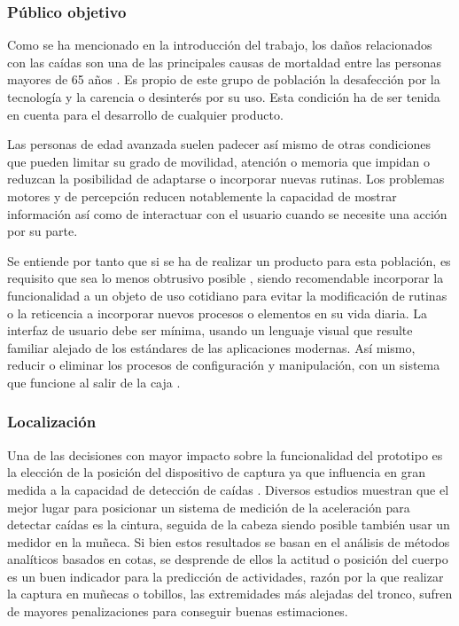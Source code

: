 \subsubsection{Público objetivo}
Como se ha mencionado en la introducción del trabajo, los daños relacionados con las caídas son una de las principales causas de mortaldad entre las personas mayores de 65 años . Es propio de este grupo de población la desafección por la tecnología y la carencia o desinterés por su uso. Esta condición ha de ser tenida en cuenta para el desarrollo de cualquier producto.

Las personas de edad avanzada suelen padecer así mismo de otras condiciones que pueden limitar su grado de movilidad, atención o memoria que impidan o reduzcan la posibilidad de adaptarse o incorporar nuevas rutinas. Los problemas motores y de percepción reducen notablemente la capacidad de mostrar información así como de interactuar con el usuario cuando se necesite una acción por su parte.

Se entiende por tanto que si se ha de realizar un producto para esta población, es requisito que sea lo menos obtrusivo posible , siendo recomendable incorporar la funcionalidad a un objeto de uso cotidiano para evitar la modificación de rutinas o la reticencia a incorporar nuevos procesos o elementos en su vida diaria. La interfaz de usuario debe ser mínima, usando un lenguaje visual que resulte familiar alejado de los estándares de las aplicaciones modernas. Así mismo, reducir o eliminar los procesos de configuración y manipulación, con un sistema que funcione al salir de la caja .

\subsubsection{Localización}

Una de las decisiones con mayor impacto sobre la funcionalidad del prototipo es la elección de la posición del dispositivo de captura ya que influencia en gran medida a la capacidad de detección de caídas \cite{Kangas2008}. Diversos estudios muestran que el mejor lugar para posicionar un sistema de medición de la aceleración para detectar caídas es la cintura, seguida de la cabeza siendo posible también usar un medidor en la muñeca\cite{Chen2005, Kangas2008, Noury2007}. Si bien estos resultados se basan en el análisis de métodos analíticos basados en cotas, se desprende de ellos la actitud o posición del cuerpo es un buen indicador para la predicción de actividades, razón por la que realizar la captura en muñecas o tobillos, las extremidades más alejadas del tronco, sufren de mayores penalizaciones para conseguir buenas estimaciones.

